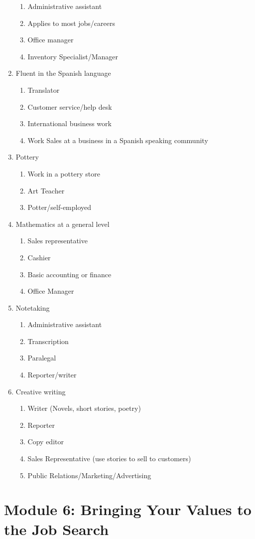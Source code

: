 \begin{enumerate}[leftmargin=*]
\begin{enumerate}
\item Administrative assistant
\item Applies to most jobs/careers
\item Office manager
\item Inventory Specialist/Manager
\end{enumerate}
\item Fluent in the Spanish language
\begin{enumerate}
\item Translator
\item Customer service/help desk
\item International business work
\item Work Sales at a business in a Spanish speaking community
\end{enumerate}
\item Pottery
\begin{enumerate}
\item Work in a pottery store
\item Art Teacher
\item Potter/self-employed
\end{enumerate}
\item Mathematics at a general level
\begin{enumerate}
\item Sales representative
\item Cashier
\item Basic accounting or finance
\item Office Manager
\end{enumerate}
\item Notetaking
\begin{enumerate}
\item Administrative assistant
\item Transcription
\item Paralegal
\item Reporter/writer
\end{enumerate}
\item Creative writing
\begin{enumerate}
\item Writer (Novels, short stories, poetry)
\item Reporter
\item Copy editor
\item Sales Representative (use stories to sell to customers)
\item Public Relations/Marketing/Advertising
\end{enumerate}
 \end{enumerate}
\pagebreak \section*{Module 6:	Bringing Your Values to the Job Search}
\noindent\makebox[\textwidth]{\rule{\linewidth}{0.4pt}} 
\localtableofcontents 
\noindent\makebox[\textwidth]{\rule{\linewidth}{0.4pt}} 


